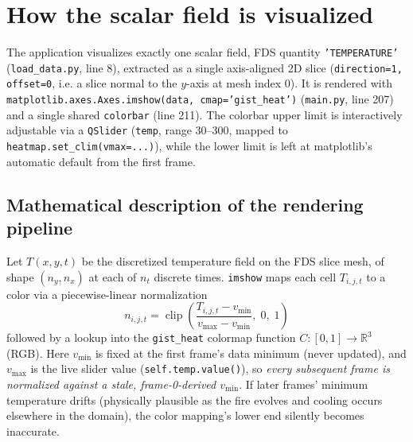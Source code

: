 \documentclass[11pt,a4paper]{report}
\begin{document}
\section{How the scalar field is visualized}

\begin{factbox}
The application visualizes exactly one scalar field, FDS quantity \texttt{'TEMPERATURE'}
(\texttt{load\_data.py}, line 8), extracted as a single axis-aligned 2D slice
(\texttt{direction=1, offset=0}, i.e. a slice normal to the $y$-axis at mesh index 0). It is rendered
with \texttt{matplotlib.axes.Axes.imshow(data, cmap='gist\_heat')} (\texttt{main.py}, line 207) and a
single shared \texttt{colorbar} (line 211). The colorbar upper limit is interactively adjustable via a
\texttt{QSlider} (\texttt{temp}, range 30--300, mapped to \texttt{heatmap.set\_clim(vmax=...)}),
while the lower limit is left at matplotlib's automatic default from the first frame.
\end{factbox}

\subsection{Mathematical description of the rendering pipeline}
Let $T(x,y,t)$ be the discretized temperature field on the FDS slice mesh, of shape
$(n_y, n_x)$ at each of $n_t$ discrete times. \texttt{imshow} maps each cell $T_{i,j,t}$ to a
color via a piecewise-linear normalization
\[
  n_{i,j,t} = \operatorname{clip}\!\left(\frac{T_{i,j,t} - v_{\min}}{v_{\max} - v_{\min}},\; 0,\; 1\right)
\]
followed by a lookup into the \texttt{gist\_heat} colormap function
$C: [0,1] \to \mathbb{R}^3$ (RGB). Here $v_{\min}$ is fixed at the first frame's data minimum (never
updated), and $v_{\max}$ is the live slider value (\texttt{self.temp.value()}), so
\emph{every subsequent frame is normalized against a stale, frame-0-derived $v_{\min}$}. If later
frames' minimum temperature drifts (physically plausible as the fire evolves and cooling occurs
elsewhere in the domain), the color mapping's lower end silently becomes inaccurate.
\end{document}
